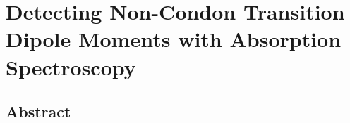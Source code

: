 \chapter{Detecting Non-Condon Transition Dipole Moments with Absorption Spectroscopy}\label{ch:detection}
\thispagestyle{plain}
\vspace{-.5cm}


\section*{Abstract}
    \dsp
    



